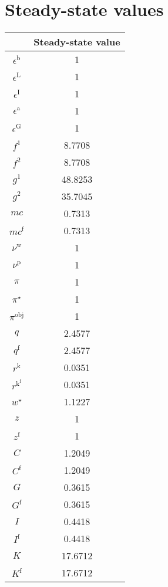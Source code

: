 

\section{Steady-state values}


\begin{tabular}{c|c|}
  & Steady-state value\\
\hline
$\epsilon^{\mathrm{b}}$ & 1 \\
$\epsilon^{\mathrm{L}}$ & 1 \\
$\epsilon^{\mathrm{I}}$ & 1 \\
$\epsilon^{\mathrm{a}}$ & 1 \\
$\epsilon^{\mathrm{G}}$ & 1 \\
$f^{\mathrm{1}}$ & 8.7708 \\
$f^{\mathrm{2}}$ & 8.7708 \\
$g^{\mathrm{1}}$ & 48.8253 \\
$g^{\mathrm{2}}$ & 35.7045 \\
${m\!c}$ & 0.7313 \\
${m\!c}^{\mathrm{f}}$ & 0.7313 \\
$\nu^{\mathrm{w}}$ & 1 \\
$\nu^{\mathrm{p}}$ & 1 \\
$\pi$ & 1 \\
$\pi^{\star}$ & 1 \\
$\pi^{\mathrm{obj}}$ & 1 \\
$q$ & 2.4577 \\
$q^{\mathrm{f}}$ & 2.4577 \\
$r^{\mathrm{k}}$ & 0.0351 \\
$r^{\mathrm{k}^{\mathrm{f}}}$ & 0.0351 \\
$w^{\star}$ & 1.1227 \\
$z$ & 1 \\
$z^{\mathrm{f}}$ & 1 \\
$C$ & 1.2049 \\
$C^{\mathrm{f}}$ & 1.2049 \\
$G$ & 0.3615 \\
$G^{\mathrm{f}}$ & 0.3615 \\
$I$ & 0.4418 \\
$I^{\mathrm{f}}$ & 0.4418 \\
$K$ & 17.6712 \\
$K^{\mathrm{f}}$ & 17.6712 \\

\end{tabular}
